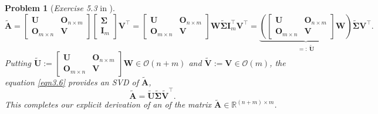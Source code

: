 \documentclass[11pt]{article}
\newtheorem{problem}{Problem}
\begin{document}
\begin{problem} [\emph{Exercise 5.3} in \cite{calafiore2014optimization}]
{\begin{equation}
    \label{eqn3.6}
    \tilde{\mathbf{A}} 
    = \begin{bmatrix}
        \mathbf{U} & \mathbf{O}_{n \times m} \\
        \mathbf{O}_{m \times n} & \mathbf{V}
    \end{bmatrix}
    \begin{bmatrix}
        \mathbf{\Sigma} \\ \mathbf{I}_m
    \end{bmatrix}
    \mathbf{V}^{\top}
    = \begin{bmatrix}
        \mathbf{U} & \mathbf{O}_{n \times m} \\
        \mathbf{O}_{m \times n} & \mathbf{V}
    \end{bmatrix}
    \mathbf{W} \tilde{\mathbf{\Sigma}} \mathbf{I}_{m}^{\top}
    \mathbf{V}^{\top}
    = \underbrace{\left( \begin{bmatrix} \mathbf{U} & \mathbf{O}_{n \times m} \\ \mathbf{O}_{m \times n} & \mathbf{V} \end{bmatrix} \mathbf{W} \right)}_{=: \ \tilde{\mathbf{U}}} \tilde{\mathbf{\Sigma}} \mathbf{V}^{\top}.
\end{equation}
Putting $\tilde{\mathbf{U}} := \begin{bmatrix} \mathbf{U} & \mathbf{O}_{n \times m} \\ \mathbf{O}_{m \times n} & \mathbf{V} \end{bmatrix} \mathbf{W} \in \mathcal{O}(n+m)$ and $\tilde{\mathbf{V}} := \mathbf{V} \in \mathcal{O}(m)$, the equation \eqref{eqn3.6} provides an \textsf{SVD} of $\tilde{\mathbf{A}}$,
\begin{equation*}
    \tilde{\mathbf{A}} = \tilde{\mathbf{U}} \tilde{\mathbf{\Sigma}} \tilde{\mathbf{V}}^{\top}.
\end{equation*}
This completes our explicit derivation of an  of the matrix $\tilde{\mathbf{A}} \in \mathbb{R}^{(n+m) \times m}$.
}
\end{problem}

\newpage



\end{document}
